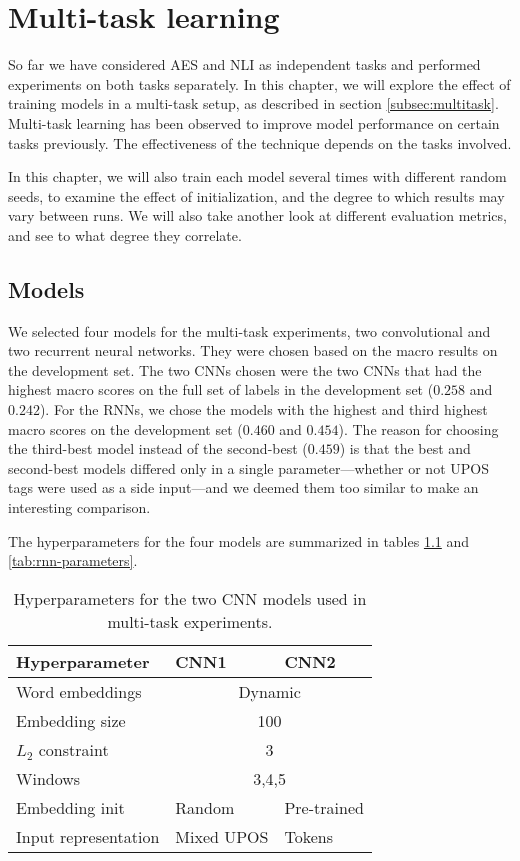 \chapter{Multi-task learning} \label{ch:multitask}

So far we have considered \ac{AES} and \ac{NLI} as independent tasks and
performed experiments on both tasks separately. In this chapter, we will
explore the effect of training models in a multi-task setup, as described in
section \ref{subsec:multitask}. Multi-task learning has been observed to
improve model performance on certain tasks previously. The effectiveness of
the technique depends on the tasks involved.

In this chapter, we will also train each model several times with different
random seeds, to examine the effect of initialization, and the degree to
which results may vary between runs. We will also take another look at
different evaluation metrics, and see to what degree they correlate.


\section{Models}

We selected four models for the multi-task experiments, two convolutional and
two recurrent neural networks. They were chosen based on the macro \FI
results on the development set. The two \acp{CNN} chosen were the two
\acp{CNN} that had the highest macro \FI scores on the full set of labels in
the development set ($0.258$ and $0.242$). For the \acp{RNN}, we chose the
models with the highest and third highest macro \FI scores on the development
set ($0.460$ and $0.454$). The reason for choosing the third-best model
instead of the second-best ($0.459$) is that the best and second-best models
differed only in a single parameter---whether or not UPOS tags were used as a
side input---and we deemed them too similar to make an interesting
comparison.

The hyperparameters for the four models are
summarized in tables \ref{tab:cnn-parameters} and \ref{tab:rnn-parameters}.

\begin{table}
  \centering
  \begin{tabular}{lll}
    \toprule
    Hyperparameter       & CNN1 & CNN2 \\
    \midrule
    Word embeddings      & \multicolumn{2}{c}{Dynamic} \\
    Embedding size       & \multicolumn{2}{c}{100} \\
    $L_2$ constraint     & \multicolumn{2}{c}{3} \\
    Windows              & \multicolumn{2}{c}{3,4,5} \\
    Embedding init       & Random & Pre-trained \\
    Input representation & Mixed UPOS & Tokens \\
    \bottomrule
  \end{tabular}
  \caption[Descriptions of the two CNN models]{
    Hyperparameters for the two CNN models used in multi-task experiments.
  }
  \label{tab:cnn-parameters}
\end{table}

